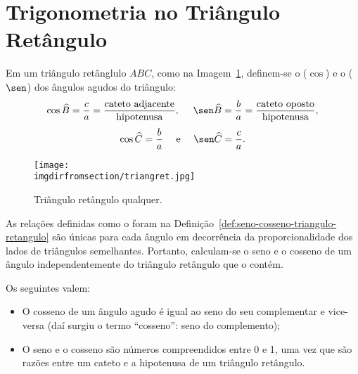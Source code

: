 \section{Trigonometria no Triângulo Retângulo}

\begin{definition}
\label{def:seno-cosseno-triangulo-retangulo}
Em um triângulo retânglulo $ABC$, como na Imagem~\ref{fig:triangulo-retangulo}, definem-se o
 ($\cos$) e o  ($\sen$) dos ângulos agudos do
triângulo:
%
$$\cos \widehat B = \frac c a = \frac {\text{cateto
adjacente}}{\text{hipotenusa}}, \ \ \ \ \sen \widehat B = \frac b a = \frac
{\text{cateto oposto}}{\text{hipotenusa}},$$
$$\cos \widehat C = \frac b a \ \ \ \ \text{e} \ \ \ \ \sen \widehat
C = \frac c a.$$    
%
\begin{figure}[H]
\centering
\texttt{[image: \\imgdirfromsection/triangret.jpg]}
\caption{Triângulo retângulo qualquer.}
\label{fig:triangulo-retangulo}
\end{figure}
\end{definition}

\begin{remark}
As relações definidas como o foram na Definição~\ref{def:seno-cosseno-triangulo-retangulo} são únicas para cada ângulo em
decorrência da proporcionalidade dos lados de triângulos
semelhantes. Portanto, calculam-se o seno e o cosseno de um ângulo
independentemente do triângulo retângulo que o contém.
\end{remark}

\begin{proposition}
Os seguintes valem:
\begin{itemize}
    \item O cosseno de um ângulo agudo é igual ao seno do seu
    complementar e vice-versa (daí surgiu o termo ``cosseno'': seno do complemento);
    \item O seno e o cosseno são números compreendidos entre 0 e 1, uma vez que são razões entre um cateto 
    e a hipotenusa de um triângulo retângulo.
\end{itemize}
\end{proposition}

